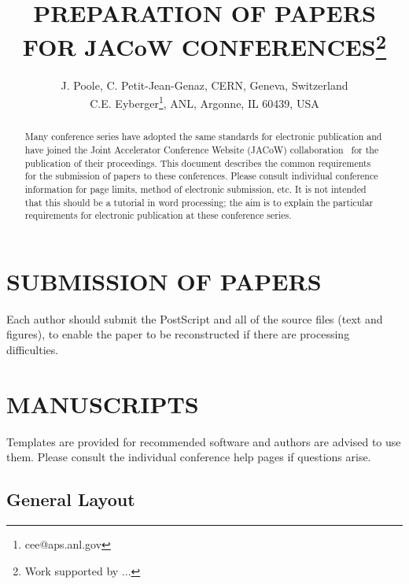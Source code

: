 \documentclass{JAC2003}
\begin{document}
\title{PREPARATION OF PAPERS FOR JACoW CONFERENCES\thanks{ Work supported by ...}}

\author{J. Poole, C. Petit-Jean-Genaz, CERN, Geneva, Switzerland\\
C.E. Eyberger\thanks{ cee@aps.anl.gov}, ANL, Argonne, IL 60439, USA}

\maketitle

\begin{abstract}
   Many conference series have adopted the same standards for electronic
   publication and have joined the Joint Accelerator Conference Website (JACoW) 
   collaboration~\cite{accelconf-ref} for the publication of their proceedings. 
   This document describes the common requirements for the submission of papers
   to these conferences. Please consult individual conference 
   information for page limits, method of electronic submission, etc.
   It is not intended that this should be a tutorial in word processing;
   the aim is to explain the particular requirements for electronic publication 
   at these conference series.
\end{abstract}

\section{SUBMISSION OF PAPERS}
Each author should submit the PostScript and all of the source files (text and figures), 
to enable the paper to be reconstructed if there are processing difficulties.

\section{MANUSCRIPTS}
Templates are provided for recommended software and authors are
advised to use them. Please consult the individual conference help pages if questions
arise.

\subsection{General Layout}
\end{document}
